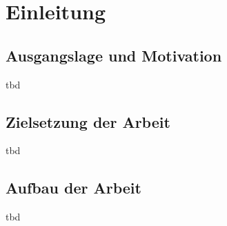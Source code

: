 \section{Einleitung}
\label{sec:einleitung}

\subsection{Ausgangslage und Motivation}
\label{subsec:motivation}
tbd

\subsection{Zielsetzung der Arbeit}
\label{subsec:zielsetzung}
tbd

\subsection{Aufbau der Arbeit}
\label{subsec:aufbau}
tbd
